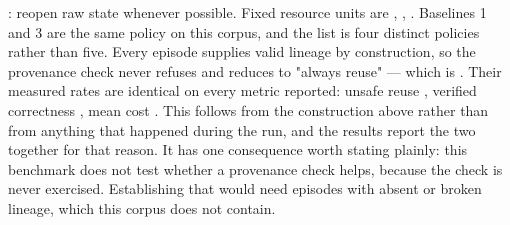 : reopen raw state whenever possible.\markdownRendererOlItemEnd 
\markdownRendererOlEndTight \markdownRendererInterblockSeparator
{}Fixed resource units are , , .\markdownRendererInterblockSeparator
{}Baselines 1 and 3 are the same policy on this corpus, and the list is four distinct policies rather than five. Every episode supplies valid lineage by construction, so the provenance check never refuses and  reduces to "always reuse" — which is . Their measured rates are identical on every metric reported: unsafe reuse , verified correctness , mean cost . This follows from the construction above rather than from anything that happened during the run, and the results report the two together for that reason. It has one consequence worth stating plainly: this benchmark does not test whether a provenance check helps, because the check is never exercised. Establishing that would need episodes with absent or broken lineage, which this corpus does not contain.
\markdownRendererSectionEnd 
\markdownRendererSectionEnd \markdownRendererDocumentEnd
